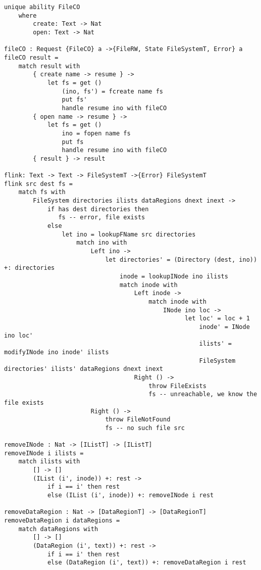 \documentclass[logo,bsc,singlespacing,parskip]{infthesis}
\begin{document}
\begin{lstlisting}[language=unison]
unique ability FileCO
    where
        create: Text -> Nat
        open: Text -> Nat

fileCO : Request {FileCO} a ->{FileRW, State FileSystemT, Error} a
fileCO result =
    match result with
        { create name -> resume } ->
            let fs = get ()
                (ino, fs') = fcreate name fs
                put fs'
                handle resume ino with fileCO
        { open name -> resume } ->
            let fs = get ()
                ino = fopen name fs
                put fs
                handle resume ino with fileCO
        { result } -> result

flink: Text -> Text -> FileSystemT ->{Error} FileSystemT
flink src dest fs =
    match fs with
        FileSystem directories ilists dataRegions dnext inext ->
            if has dest directories then
               fs -- error, file exists
            else
                let ino = lookupFName src directories
                    match ino with
                        Left ino ->
                            let directories' = (Directory (dest, ino)) +: directories
                                inode = lookupINode ino ilists
                                match inode with
                                    Left inode ->
                                        match inode with
                                            INode ino loc ->
                                                  let loc' = loc + 1
                                                      inode' = INode ino loc'
                                                      ilists' = modifyINode ino inode' ilists
                                                      FileSystem directories' ilists' dataRegions dnext inext
                                    Right () -> 
                                        throw FileExists
                                        fs -- unreachable, we know the file exists
                        Right () -> 
                            throw FileNotFound
                            fs -- no such file src

removeINode : Nat -> [IListT] -> [IListT]
removeINode i ilists =
    match ilists with
        [] -> []
        (IList (i', inode)) +: rest ->
            if i == i' then rest
            else (IList (i', inode)) +: removeINode i rest

removeDataRegion : Nat -> [DataRegionT] -> [DataRegionT]
removeDataRegion i dataRegions =
    match dataRegions with
        [] -> []
        (DataRegion (i', text)) +: rest ->
            if i == i' then rest
            else (DataRegion (i', text)) +: removeDataRegion i rest


\end{lstlisting}
\end{document}
